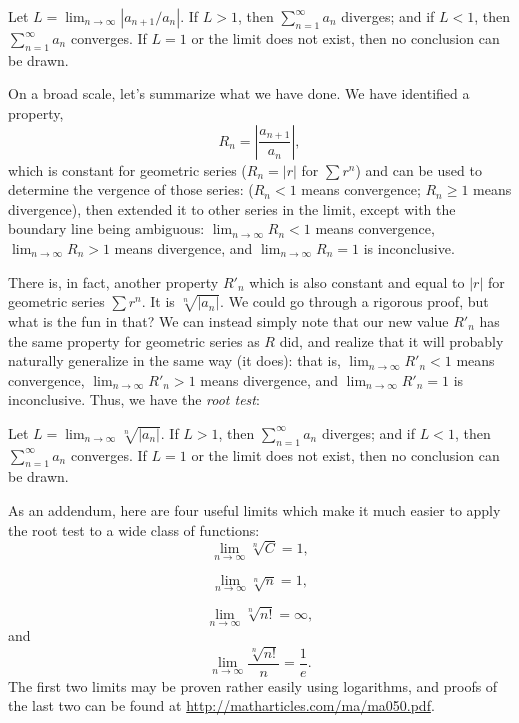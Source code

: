 \documentclass{myarticle}
\theoremstyle{nospace}
\newtheorem{old series theorem}{Theorem}
\newenvironment{series theorem}
{\begin{mdframed}\begin{old series theorem}}
    {\end{old series theorem}\end{mdframed}}
\begin{document}
\begin{series theorem}
  Let $L = \lim_{n \to \infty} |a_{n+1}/a_n|$. If $L > 1$, then
  $\sum_{n=1}^\infty a_n$ diverges; and if $L < 1$, then
  $\sum_{n=1}^\infty a_n$ converges. If $L = 1$ or the limit does not
  exist, then no conclusion can be drawn.
\end{series theorem}

On a broad scale, let's summarize what we have done. We have
identified a property,
\[
  R_n = \left|\frac{a_{n+1}}{a_n}\right|,
\]
which is constant for geometric series ($R_n = |r|$ for $\sum r^n$)
and can be used to determine the vergence of those series: ($R_n < 1$
means convergence; $R_n \geq 1$ means divergence), then extended it to
other series in the limit, except with the boundary line being
ambiguous: $\lim_{n \to \infty} R_n < 1$ means convergence,
$\lim_{n \to \infty} R_n > 1$ means divergence, and
$\lim_{n \to \infty} R_n = 1$ is inconclusive.

There is, in fact, another property $R'_n$ which is also constant and
equal to $|r|$ for geometric series $\sum r^n$. It is
$\sqrt[n]{|a_n|}$. We could go through a rigorous proof, but what is
the fun in that? We can instead simply note that our new value $R'_n$
has the same property for geometric series as $R$ did, and realize
that it will probably naturally generalize in the same way (it does):
that is, $\lim_{n \to \infty} R'_n < 1$ means convergence,
$\lim_{n \to \infty} R'_n > 1$ means divergence, and
$\lim_{n \to \infty} R'_n = 1$ is inconclusive. Thus, we have the
\emph{root test}:

\begin{series theorem}
  Let $L = \lim_{n \to \infty} \sqrt[n]{|a_n|}$. If $L > 1$, then
  $\sum_{n=1}^\infty a_n$ diverges; and if $L < 1$, then
  $\sum_{n=1}^\infty a_n$ converges. If $L = 1$ or the limit does not
  exist, then no conclusion can be drawn.
\end{series theorem}

As an addendum, here are four useful limits which make it much easier
to apply the root test to a wide class of functions:
\[
  \lim_{n \to \infty} \sqrt[n]{C} = 1,
\]

\[
  \lim_{n \to \infty} \sqrt[n]{n} = 1,
\]

\[
  \lim_{n \to \infty} \sqrt[n]{n!} = \infty,
\]
and
\[
  \lim_{n \to \infty} \frac{\sqrt[n]{n!}}{n} = \frac{1}{e}.
\]
The first two limits may be proven rather easily using logarithms, and
proofs of the last two can be found at
\url{http://matharticles.com/ma/ma050.pdf}.
\end{document}
